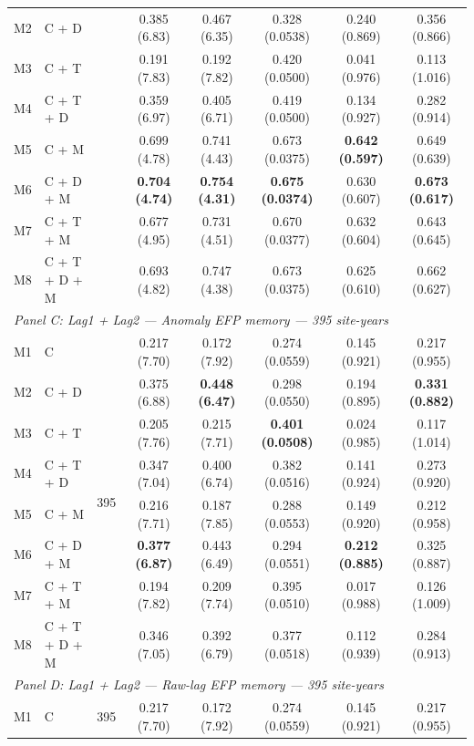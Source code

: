 \begin{table}[htbp]
\begin{tabular}{llcccccc}
M2 & C + D &  & 0.385 (6.83) & 0.467 (6.35) & 0.328 (0.0538) & 0.240 (0.869) & 0.356 (0.866) \\
M3 & C + T &  & 0.191 (7.83) & 0.192 (7.82) & 0.420 (0.0500) & 0.041 (0.976) & 0.113 (1.016) \\
M4 & C + T + D &  & 0.359 (6.97) & 0.405 (6.71) & 0.419 (0.0500) & 0.134 (0.927) & 0.282 (0.914) \\
M5 & C + M &  & 0.699 (4.78) & 0.741 (4.43) & 0.673 (0.0375) & \textbf{0.642 (0.597)} & 0.649 (0.639) \\
M6 & C + D + M &  & \textbf{0.704 (4.74)} & \textbf{0.754 (4.31)} & \textbf{0.675 (0.0374)} & 0.630 (0.607) & \textbf{0.673 (0.617)} \\
M7 & C + T + M &  & 0.677 (4.95) & 0.731 (4.51) & 0.670 (0.0377) & 0.632 (0.604) & 0.643 (0.645) \\
M8 & C + T + D + M &  & 0.693 (4.82) & 0.747 (4.38) & 0.673 (0.0375) & 0.625 (0.610) & 0.662 (0.627) \\
\midrule
\multicolumn{8}{l}{\textit{Panel C: Lag1 + Lag2 --- Anomaly EFP memory --- 395 site-years}} \\
\midrule
M1 & C & \multirow{8}{*}{395} & 0.217 (7.70) & 0.172 (7.92) & 0.274 (0.0559) & 0.145 (0.921) & 0.217 (0.955) \\
M2 & C + D &  & 0.375 (6.88) & \textbf{0.448 (6.47)} & 0.298 (0.0550) & 0.194 (0.895) & \textbf{0.331 (0.882)} \\
M3 & C + T &  & 0.205 (7.76) & 0.215 (7.71) & \textbf{0.401 (0.0508)} & 0.024 (0.985) & 0.117 (1.014) \\
M4 & C + T + D &  & 0.347 (7.04) & 0.400 (6.74) & 0.382 (0.0516) & 0.141 (0.924) & 0.273 (0.920) \\
M5 & C + M &  & 0.216 (7.71) & 0.187 (7.85) & 0.288 (0.0553) & 0.149 (0.920) & 0.212 (0.958) \\
M6 & C + D + M &  & \textbf{0.377 (6.87)} & 0.443 (6.49) & 0.294 (0.0551) & \textbf{0.212 (0.885)} & 0.325 (0.887) \\
M7 & C + T + M &  & 0.194 (7.82) & 0.209 (7.74) & 0.395 (0.0510) & 0.017 (0.988) & 0.126 (1.009) \\
M8 & C + T + D + M &  & 0.346 (7.05) & 0.392 (6.79) & 0.377 (0.0518) & 0.112 (0.939) & 0.284 (0.913) \\
\midrule
\multicolumn{8}{l}{\textit{Panel D: Lag1 + Lag2 --- Raw-lag EFP memory --- 395 site-years}} \\
\midrule
M1 & C & \multirow{8}{*}{395} & 0.217 (7.70) & 0.172 (7.92) & 0.274 (0.0559) & 0.145 (0.921) & 0.217 (0.955) \\

\end{tabular}
\end{table}
